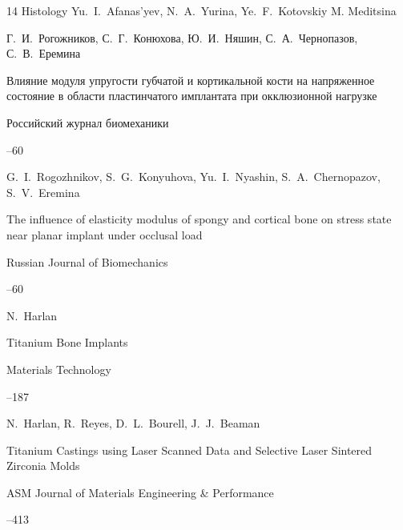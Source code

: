 \begin{thebibliography}{14}
\book Histology \by Yu.~I.~Afanas'yev, N.~A.~Yurina, Ye.~F.~Kotovskiy \publaddr M. \publ Meditsina  




\by Г.~И.~Рогожников, С.~Г.~Конюхова, Ю.~И.~Няшин, С.~А.~Чернопазов, С.~В.~Еремина

\paper Влияние модуля упругости губчатой и кортикальной кости на напряженное состояние в области пластинчатого имплантата при окклюзионной нагрузке

\jour Российский журнал биомеханики




--60

\misctransl

\by G.~I.~Rogozhnikov, S.~G.~Konyuhova, Yu.~I.~Nyashin, S.~A.~Chernopazov, S.~V.~Eremina 

\paper The influence of elasticity modulus of spongy and cortical bone on stress state near planar implant under occlusal load

\jour Russian Journal of Biomechanics




--60






\by N.~Harlan

\paper Titanium Bone Implants

\jour Materials Technology




--187




\by N.~Harlan, R.~Reyes, D.~L.~Bourell, J.~J.~Beaman

\paper Titanium Castings using Laser Scanned Data and Selective Laser Sintered Zirconia Molds

\jour ASM Journal of Materials Engineering \& Performance



--413


\end{thebibliography}
